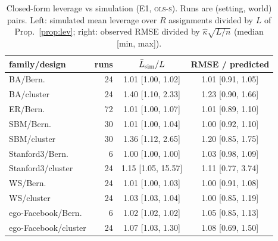 \begin{table}[h]\centering\footnotesize
\caption{Closed-form leverage vs simulation (E1, \textsc{ols-s}). Runs are (setting, world) pairs. Left: simulated mean leverage over $R$ assignments divided by $L$ of Prop.~\ref{prop:lev}; right: observed RMSE divided by $\hat\kappa\sqrt{L/n}$ (median [min, max]).}
\label{tab:lev}\begin{tabular}{lrcc}\toprule
family/design & runs & $\bar L_{\rm sim}/L$ & RMSE / predicted \\
\midrule
BA/Bern. & 24 & 1.01 [1.00, 1.02] & 1.01 [0.91, 1.05] \\
BA/cluster & 24 & 1.40 [1.10, 2.33] & 1.23 [0.90, 1.66] \\
ER/Bern. & 72 & 1.01 [1.00, 1.07] & 1.01 [0.89, 1.10] \\
SBM/Bern. & 30 & 1.01 [1.00, 1.04] & 1.00 [0.92, 1.10] \\
SBM/cluster & 30 & 1.36 [1.12, 2.65] & 1.20 [0.85, 1.75] \\
Stanford3/Bern. & 6 & 1.00 [1.00, 1.00] & 1.03 [0.98, 1.09] \\
Stanford3/cluster & 24 & 1.15 [1.05, 15.57] & 1.11 [0.77, 3.74] \\
WS/Bern. & 24 & 1.01 [1.00, 1.03] & 1.00 [0.91, 1.08] \\
WS/cluster & 24 & 1.03 [1.03, 1.04] & 1.00 [0.85, 1.19] \\
ego-Facebook/Bern. & 6 & 1.02 [1.02, 1.02] & 1.05 [0.85, 1.13] \\
ego-Facebook/cluster & 24 & 1.07 [1.03, 1.30] & 1.08 [0.69, 1.50] \\
\bottomrule\end{tabular}\end{table}
